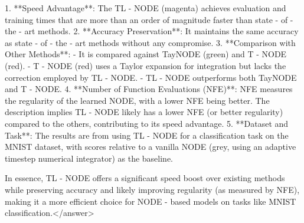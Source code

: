 1. **Speed Advantage**: The TL - NODE (magenta) achieves evaluation and training times that are more than an order of magnitude faster than state - of - the - art methods.  
2. **Accuracy Preservation**: It maintains the same accuracy as state - of - the - art methods without any compromise.  
3. **Comparison with Other Methods**:  
   - It is compared against TayNODE (green) and T - NODE (red).  
   - T - NODE (red) uses a Taylor expansion for integration but lacks the correction employed by TL - NODE.  
   - TL - NODE outperforms both TayNODE and T - NODE.  
4. **Number of Function Evaluations (NFE)**: NFE measures the regularity of the learned NODE, with a lower NFE being better. The description implies TL - NODE likely has a lower NFE (or better regularity) compared to the others, contributing to its speed advantage.  
5. **Dataset and Task**: The results are from using TL - NODE for a classification task on the MNIST dataset, with scores relative to a vanilla NODE (grey, using an adaptive timestep numerical integrator) as the baseline.  


In essence, TL - NODE offers a significant speed boost over existing methods while preserving accuracy and likely improving regularity (as measured by NFE), making it a more efficient choice for NODE - based models on tasks like MNIST classification.</answer>